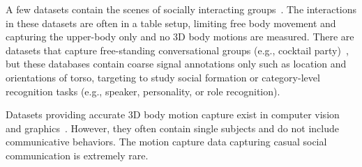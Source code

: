 A few datasets contain the scenes of socially interacting groups~\cite{mccowan2005ami, zancanaro2006automatic, lepri2012connecting, rehg2013decoding}. The interactions in these datasets are often in a table setup, limiting free body movement and capturing the upper-body only and no 3D body motions are measured. There are datasets that capture free-standing conversational groups (e.g., cocktail party)~\cite{Zen-10, Cristani-11, alameda2016salsa, farenzena2009social}, but these databases contain coarse signal annotations only such as location and orientations of torso, targeting to study social formation or category-level recognition tasks (e.g., speaker, personality, or role recognition).

Datasets providing accurate 3D body motion capture exist in computer vision and graphics~\cite{gross2001cmu, h36m_pami, sigal2010humaneva}.  However, they often contain single subjects and do not include communicative behaviors. The motion capture data capturing casual social communication is extremely rare. 

%





